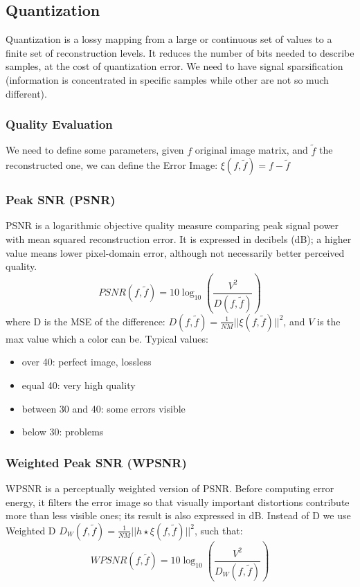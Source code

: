 \subsection{Quantization}
Quantization is a lossy mapping from a large or continuous set of values to a finite set of reconstruction levels. It reduces the number of bits needed to describe samples, at the cost of quantization error.
We need to have signal sparsification (information is concentrated in specific samples while other are not so much different).
\subsubsection{Quality Evaluation}
We need to define some parameters, given $f$ original image matrix, and $\tilde{f}$ the reconstructed one, we can define the Error Image: $\xi(f,\tilde{f}) = f - \tilde{f}$ 
\subsubsection{Peak SNR (PSNR)}
PSNR is a logarithmic objective quality measure comparing peak signal power with mean squared reconstruction error. It is expressed in decibels (dB); a higher value means lower pixel-domain error, although not necessarily better perceived quality.
$$PSNR(f, \tilde{f}) = 10 \log_{10}\left(\frac{V^2}{D(f, \tilde{f})}\right)$$
where D is the MSE of the difference: $D(f,\tilde{f}) = \frac{1}{NM}||\xi(f,\tilde{f})||^2$, and $V$ is the max value which a color can be.
Typical values:
\begin{itemize}
    \item over 40: perfect image, lossless
    \item equal 40: very high quality
    \item between 30 and 40: some errors visible
    \item below 30: problems
\end{itemize}
\subsubsection{Weighted Peak SNR (WPSNR)}
WPSNR is a perceptually weighted version of PSNR. Before computing error energy, it filters the error image so that visually important distortions contribute more than less visible ones; its result is also expressed in dB.
Instead of D we use Weighted D $D_{W}(f,\tilde{f}) = \frac{1}{NM}||h\star\xi(f,\tilde{f})||^2$, such that:
$$WPSNR(f, \tilde{f}) = 10 \log_{10}\left(\frac{V^2}{D_W(f, \tilde{f})}\right)$$
